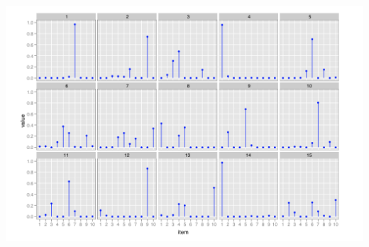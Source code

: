 \documentclass[11pt,compress,professionalfonts]{beamer}
\newcommand{\ita}{\begin{itemize}}
\newcommand{\itm}{\item[]}
\newcommand{\itz}{\end{itemize}}
\begin{document}

\centerline{\includegraphics[scale=1]{pictures/dirichlet-alpha-tenth}}





%
%
%
%
%
%
\end{document}
